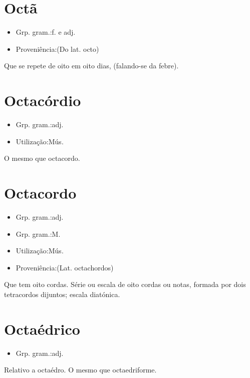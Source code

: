\section{Octã}
\begin{itemize}
\item {Grp. gram.:f.  e  adj.}
\end{itemize}
\begin{itemize}
\item {Proveniência:(Do lat. \textunderscore octo\textunderscore )}
\end{itemize}
Que se repete de oito em oito dias, (falando-se da febre).
\section{Octacórdio}
\begin{itemize}
\item {Grp. gram.:adj.}
\end{itemize}
\begin{itemize}
\item {Utilização:Mús.}
\end{itemize}
O mesmo que \textunderscore octacordo\textunderscore .
\section{Octacordo}
\begin{itemize}
\item {Grp. gram.:adj.}
\end{itemize}
\begin{itemize}
\item {Grp. gram.:M.}
\end{itemize}
\begin{itemize}
\item {Utilização:Mús.}
\end{itemize}
\begin{itemize}
\item {Proveniência:(Lat. \textunderscore octachordos\textunderscore )}
\end{itemize}
Que tem oito cordas.
Série ou escala de oito cordas ou notas, formada por dois tetracordos dijuntos; escala diatónica.
\section{Octaédrico}
\begin{itemize}
\item {Grp. gram.:adj.}
\end{itemize}
Relativo a octaédro.
O mesmo que \textunderscore octaedriforme\textunderscore .
